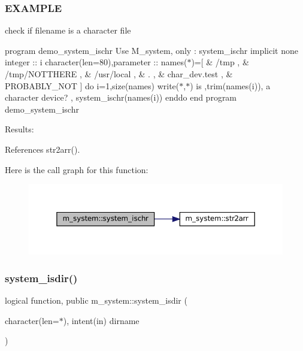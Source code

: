\subsubsection*{E\+X\+A\+M\+P\+LE}

check if filename is a character file

program demo\+\_\+system\+\_\+ischr Use M\+\_\+system, only \+: system\+\_\+ischr implicit none integer \+:\+: i character(len=80),parameter \+:\+: names($\ast$)=\mbox{[} \& \textquotesingle{}/tmp \textquotesingle{}, \& \textquotesingle{}/tmp/\+N\+O\+T\+T\+H\+E\+RE \textquotesingle{}, \& \textquotesingle{}/usr/local \textquotesingle{}, \& \textquotesingle{}. \textquotesingle{}, \& \textquotesingle{}char\+\_\+dev.\+test \textquotesingle{}, \& \textquotesingle{}P\+R\+O\+B\+A\+B\+L\+Y\+\_\+\+N\+OT \textquotesingle{}\mbox{]} do i=1,size(names) write($\ast$,$\ast$)\textquotesingle{} is \textquotesingle{},trim(names(i)),\textquotesingle{} a character device? \textquotesingle{}, system\+\_\+ischr(names(i)) enddo end program demo\+\_\+system\+\_\+ischr

Results\+: 

References str2arr().

Here is the call graph for this function\+:
\nopagebreak
\begin{figure}[H]
\begin{center}
\leavevmode
\includegraphics[width=350pt]{namespacem__system_a12a948fa4aacda084a538ae3a5ae3cc6_cgraph}
\end{center}
\end{figure}
\mbox{\label{namespacem__system_ad097988a031e64b4f21f856cf45c9c73}} 
\subsubsection{\texorpdfstring{system\+\_\+isdir()}{system\_isdir()}}
{\footnotesize\ttfamily logical function, public m\+\_\+system\+::system\+\_\+isdir (\begin{DoxyParamCaption}\item[{character(len=$\ast$), intent(in)}]{dirname }\end{DoxyParamCaption})}



